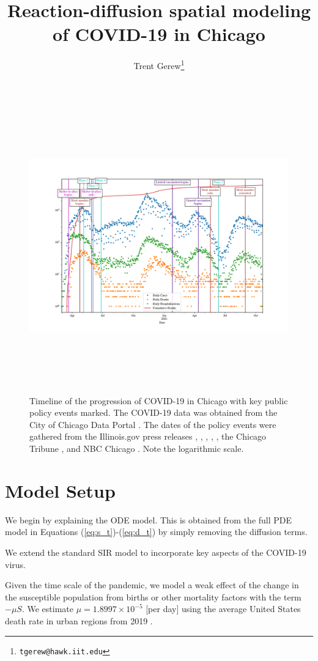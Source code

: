 \documentclass[11pt]{article}
\title{Reaction-diffusion spatial modeling of COVID-19 in Chicago}
\author{Trent Gerew\thanks{\texttt{tgerew@hawk.iit.edu}}}
\institute{Department of Applied Mathematics, Illinois Institute of Technology, Chicago, Illinois}
\begin{document}
\maketitle

	\begin{figure}[h]
		\centering
		\includegraphics[height=12cm]{chicago-data2}
		\label{fig:data}
		\caption{Timeline of the progression of COVID-19 in Chicago with key public policy events marked.
			The COVID-19 data was obtained from the City of Chicago Data Portal \cite{Chicago-cases}.
			The dates of the policy events were gathered from the Illinois.gov press releases \cite{phase-5}, \cite{mask-lift}, \cite{full-vax}, \cite{start-vax}, \cite{phase-4}, the Chicago Tribune \cite{phase-3}, and NBC Chicago \cite{phase-2}.
			Note the logarithmic scale.}
	\end{figure}

\section{Model Setup}
	We begin by explaining the ODE model.
	This is obtained from the full PDE model in Equations (\ref{eq:s_t})-(\ref{eq:d_t}) by simply removing the diffusion terms.
	
	We extend the standard SIR model to incorporate key aspects of the COVID-19 virus.
	
	Given the time scale of the pandemic, we model a weak effect of the change in the susceptible population from births or other mortality factors with the term $- \mu S$.
	We estimate $\mu = 1.8997 \times 10^{-5}$ [per day] using the average United States death rate in urban regions from 2019 \cite{death-trends}.
	
\end{document}
